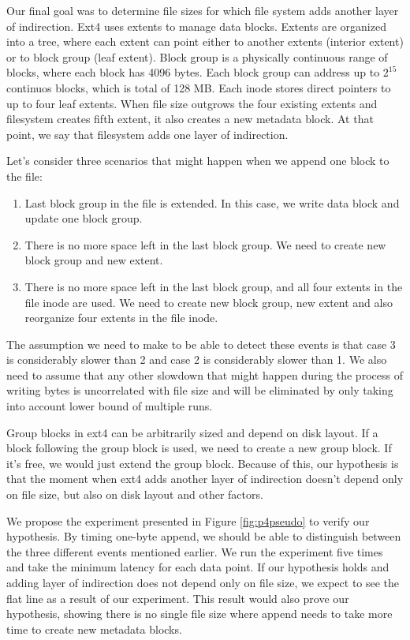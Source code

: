 Our final goal was to determine file sizes for which file system adds another layer of indirection. Ext4 uses extents to manage data blocks. Extents are organized into a tree, where each extent can point either to another extents (interior extent) or to block group (leaf extent). Block group is a physically continuous range of blocks, where each block has 4096 bytes. Each block group can address up to $2^15$ continuos blocks, which is total of 128 MB. Each inode stores direct pointers to up to four leaf extents. When file size outgrows the four existing extents and filesystem creates fifth extent, it also creates a new metadata block. At that point, we say that filesystem adds one layer of indirection.

Let's consider three scenarios that might happen when we append one block to the file:
\begin{enumerate}
\item Last block group in the file is extended. In this case, we write data block and update one block group.
\item There is no more space left in the last block group. We need to create new block group and new extent.
\item There is no more space left in the last block group, and all four extents in the file inode are used. We need to create new block group, new extent and also reorganize four extents in the file inode.
\end{enumerate}

The assumption we need to make to be able to detect these events is that case 3 is considerably slower than 2 and case 2 is considerably slower than 1. We also need to assume that any other slowdown that might happen during the process of writing bytes is uncorrelated with file size and will be eliminated by only taking into account lower bound of multiple runs.

Group blocks in ext4 can be arbitrarily sized and depend on disk layout. If a block following the group block is used, we need to create a new group block. If it's free, we would just extend the group block. Because of this, our hypothesis is that the moment when ext4 adds another layer of indirection doesn't depend only on file size, but also on disk layout and other factors.

We propose the experiment presented in Figure \ref{fig:p4pseudo} to verify our hypothesis. By timing one-byte append, we should be able to distinguish between the three different events mentioned earlier. We run the experiment five times and take the minimum latency for each data point. If our hypothesis holds and adding layer of indirection does not depend only on file size, we expect to see the flat line as a result of our experiment. This result would also prove our hypothesis, showing there is no single file size where append needs to take more time to create new metadata blocks.

